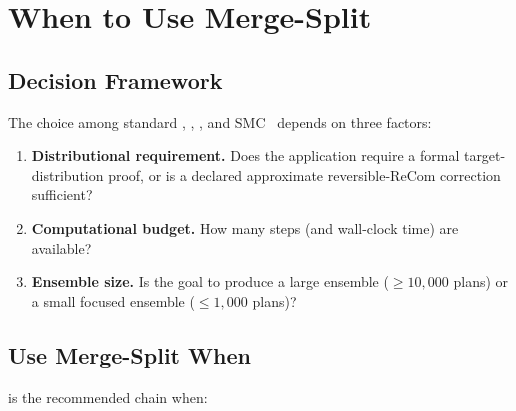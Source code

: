 \section{When to Use Merge-Split}
\label{sec:when-to-use}

\subsection{Decision Framework}

The choice among standard \recom{}, \mergesplit{}, \forestrecom{}, and
SMC~\citep{dellaLibera2026smc} depends on three factors:

\begin{enumerate}
  \item \textbf{Distributional requirement.} Does the application require a
        formal target-distribution proof, or is a declared approximate
        reversible-ReCom correction sufficient?
  \item \textbf{Computational budget.} How many steps (and wall-clock
        time) are available?
  \item \textbf{Ensemble size.} Is the goal to produce a large ensemble
        ($\geq 10{,}000$ plans) or a small focused ensemble
        ($\leq 1{,}000$ plans)?
\end{enumerate}

\subsection{Use Merge-Split When}

\mergesplit{} is the recommended chain when:

